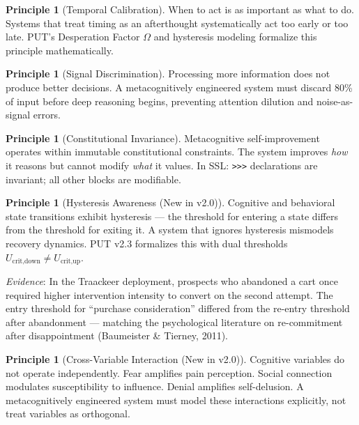 \documentclass[12pt,a4paper]{article}
\theoremstyle{plain}
\theoremstyle{definition}
\newtheorem{principle}[theorem]{Principle}
\theoremstyle{remark}
\begin{document}
\begin{principle}[Temporal Calibration]
\label{pr:temporal}
When to act is as important as what to do. Systems that treat timing as an afterthought systematically act too early or too late. PUT's Desperation Factor $\Omega$ and hysteresis modeling formalize this principle mathematically.
\end{principle}

\begin{principle}[Signal Discrimination]
\label{pr:signal}
Processing more information does not produce better decisions. A metacognitively engineered system must discard 80\% of input before deep reasoning begins, preventing attention dilution and noise-as-signal errors.
\end{principle}

\begin{principle}[Constitutional Invariance]
\label{pr:constitutional}
Metacognitive self-improvement operates within immutable constitutional constraints. The system improves \emph{how} it reasons but cannot modify \emph{what} it values. In SSL: \texttt{>>>} declarations are invariant; all other blocks are modifiable.
\end{principle}

\begin{principle}[Hysteresis Awareness \textnormal{(New in v2.0)}]
\label{pr:hysteresis}
Cognitive and behavioral state transitions exhibit hysteresis --- the threshold for entering a state differs from the threshold for exiting it. A system that ignores hysteresis mismodels recovery dynamics. PUT v2.3 formalizes this with dual thresholds $U_{\text{crit,down}} \neq U_{\text{crit,up}}$.
\end{principle}

\textit{Evidence}: In the Traackeer deployment, prospects who abandoned a cart once required higher intervention intensity to convert on the second attempt. The entry threshold for ``purchase consideration'' differed from the re-entry threshold after abandonment --- matching the psychological literature on re-commitment after disappointment (Baumeister \& Tierney, 2011).

\begin{principle}[Cross-Variable Interaction \textnormal{(New in v2.0)}]
\label{pr:crossvar}
Cognitive variables do not operate independently. Fear amplifies pain perception. Social connection modulates susceptibility to influence. Denial amplifies self-delusion. A metacognitively engineered system must model these interactions explicitly, not treat variables as orthogonal.
\end{principle}
\end{document}
